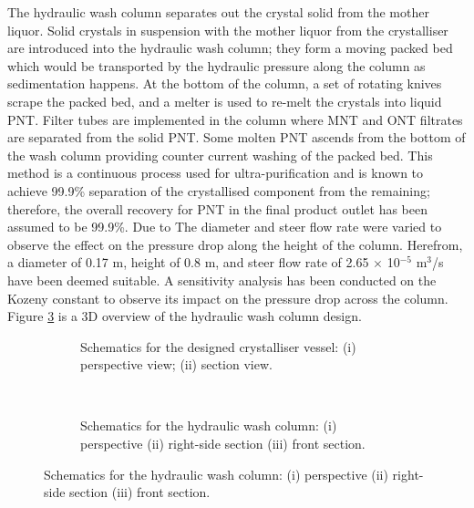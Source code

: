 The hydraulic wash column separates out the crystal solid from the mother liquor. Solid crystals in suspension with the mother liquor from the crystalliser are introduced into the hydraulic wash column; they form a moving packed bed which would be transported by the hydraulic pressure along the column as sedimentation happens. At the bottom of the column, a set of rotating knives scrape the packed bed, and a melter is used to re-melt the crystals into liquid PNT. Filter tubes are implemented in the column where MNT and ONT filtrates are separated from the solid PNT. Some molten PNT ascends from the bottom of the wash column providing counter current washing of the packed bed. This method is a continuous process used for ultra-purification and is known to achieve 99.9\% separation of the crystallised component from the remaining; therefore, the overall recovery for PNT in the final product outlet has been assumed to be 99.9\%. Due to The diameter and steer flow rate were varied to observe the effect on the pressure drop along the height of the column. Herefrom, a diameter of 0.17 m, height of 0.8 m, and steer flow rate of 2.65 $\times$ 10$^{-5}$ m$^{3}$/s have been deemed suitable. A sensitivity analysis has been conducted on the Kozeny constant to observe its impact on the pressure drop across the column. Figure \ref{fig:wash column schematic executive} is a 3D overview of the hydraulic wash column design.


\begin{figure}[h]
    \centering
    \begin{subfigure}[h]{0.5\textwidth}
    \centering
    
    \caption{Schematics for the designed crystalliser vessel: (i) perspective view; (ii) section view.}
    \label{fig:crystalliser schematic executive}
    \end{subfigure}%
    ~ 
    \begin{subfigure}[h]{0.5\textwidth}
    \centering
    
    \caption{Schematics for the hydraulic wash column: (i) perspective (ii) right-side section (iii) front section.}
    \label{fig:wash column schematic executive}
    \end{subfigure}
\end{figure}
